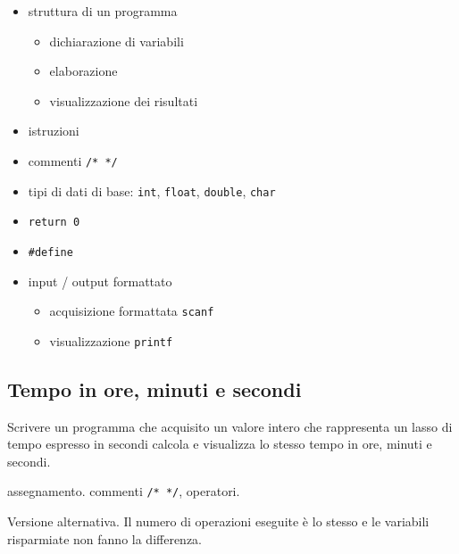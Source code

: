 \begin{itemize}
\item struttura di un programma
    \begin{itemize}
    \item dichiarazione di variabili
    \item elaborazione
    \item visualizzazione dei risultati
    \end{itemize}
\item istruzioni
\item commenti \texttt{/* */}
\item tipi di dati di base: \texttt{int}, \texttt{float}, \texttt{double}, \texttt{char}
\item \texttt{return 0}
\item \texttt{\#define}
\item input / output formattato
    \begin{itemize}
    \item acquisizione formattata \texttt{scanf}
    \item visualizzazione \texttt{printf}
    \end{itemize}
\end{itemize}

\mysep{}


\subsection{Tempo in ore, minuti e secondi}
Scrivere un programma che acquisito un valore intero che rappresenta un lasso di tempo espresso in secondi calcola e visualizza lo stesso tempo in ore, minuti e secondi.

\begin{tags}
assegnamento. commenti \texttt{/* */}, operatori.
\end{tags}


Versione alternativa. Il numero di operazioni eseguite \`e lo stesso e le variabili risparmiate non fanno la differenza.

